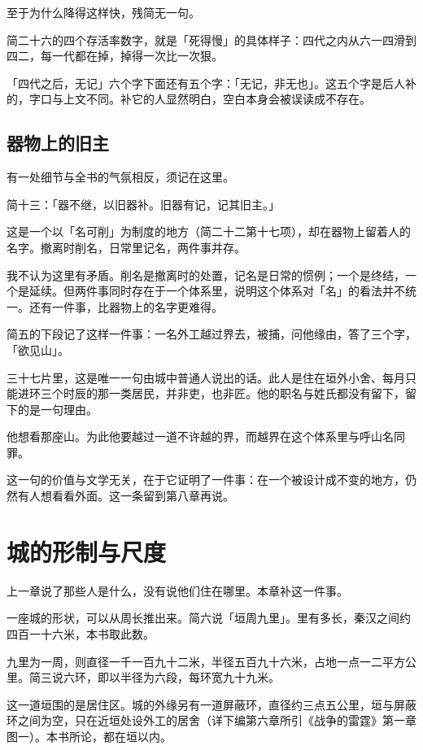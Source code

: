 至于为什么降得这样快，残简无一句。

简二十六的四个存活率数字，就是「死得慢」的具体样子：四代之内从六一四滑到四二，每一代都在掉，掉得一次比一次狠。

「四代之后，无记」六个字下面还有五个字：「无记，非无也」。这五个字是后人补的，字口与上文不同。补它的人显然明白，空白本身会被误读成不存在。

\section{器物上的旧主}

有一处细节与全书的气氛相反，须记在这里。

简十三：「器不继，以旧器补。旧器有记，记其旧主。」

这是一个以「名可削」为制度的地方（简二十二第十七项），却在器物上留着人的名字。撤离时削名，日常里记名，两件事并存。

我不认为这里有矛盾。削名是撤离时的处置，记名是日常的惯例；一个是终结，一个是延续。但两件事同时存在于一个体系里，说明这个体系对「名」的看法并不统一。还有一件事，比器物上的名字更难得。

简五的下段记了这样一件事：一名外工越过界去，被捕，问他缘由，答了三个字，「欲见山」。

三十七片里，这是唯一一句由城中普通人说出的话。此人是住在垣外小舍、每月只能进环三个时辰的那一类居民，并非吏，也非匠。他的职名与姓氏都没有留下，留下的是一句理由。

他想看那座山。为此他要越过一道不许越的界，而越界在这个体系里与呼山名同罪。

这一句的价值与文学无关，在于它证明了一件事：在一个被设计成不变的地方，仍然有人想看看外面。这一条留到第八章再说。

\chapter{城的形制与尺度}

上一章说了那些人是什么，没有说他们住在哪里。本章补这一件事。

一座城的形状，可以从周长推出来。简六说「垣周九里」。里有多长，秦汉之间约四百一十六米，本书取此数。

九里为一周，则直径一千一百九十二米，半径五百九十六米，占地一点一二平方公里。简三说六环，即以半径为六段，每环宽九十九米。

这一道垣围的是居住区。城的外缘另有一道屏蔽环，直径约三点五公里，垣与屏蔽环之间为空，只在近垣处设外工的居舍（详下编第六章所引《战争的雷霆》第一章图一）。本书所论，都在垣以内。

